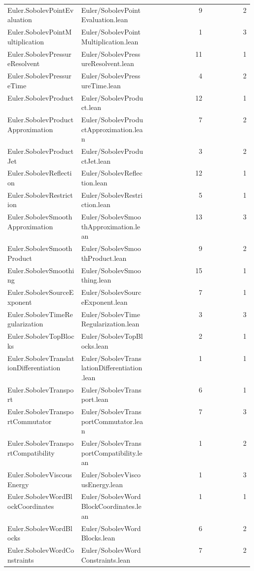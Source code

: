 \begin{longtable}{p{0.30\linewidth}p{0.28\linewidth}rr}
Euler.SobolevPointEvaluation & Euler/SobolevPointEvaluation.lean & 9 & 2\\
Euler.SobolevPointMultiplication & Euler/SobolevPointMultiplication.lean & 1 & 3\\
Euler.SobolevPressureResolvent & Euler/SobolevPressureResolvent.lean & 11 & 1\\
Euler.SobolevPressureTime & Euler/SobolevPressureTime.lean & 4 & 2\\
Euler.SobolevProduct & Euler/SobolevProduct.lean & 12 & 1\\
Euler.SobolevProductApproximation & Euler/SobolevProductApproximation.lean & 7 & 2\\
Euler.SobolevProductJet & Euler/SobolevProductJet.lean & 3 & 2\\
Euler.SobolevReflection & Euler/SobolevReflection.lean & 12 & 1\\
Euler.SobolevRestriction & Euler/SobolevRestriction.lean & 5 & 1\\
Euler.SobolevSmoothApproximation & Euler/SobolevSmoothApproximation.lean & 13 & 3\\
Euler.SobolevSmoothProduct & Euler/SobolevSmoothProduct.lean & 9 & 2\\
Euler.SobolevSmoothing & Euler/SobolevSmoothing.lean & 15 & 1\\
Euler.SobolevSourceExponent & Euler/SobolevSourceExponent.lean & 7 & 1\\
Euler.SobolevTimeRegularization & Euler/SobolevTimeRegularization.lean & 3 & 3\\
Euler.SobolevTopBlocks & Euler/SobolevTopBlocks.lean & 2 & 1\\
Euler.SobolevTranslationDifferentiation & Euler/SobolevTranslationDifferentiation.lean & 1 & 1\\
Euler.SobolevTransport & Euler/SobolevTransport.lean & 6 & 1\\
Euler.SobolevTransportCommutator & Euler/SobolevTransportCommutator.lean & 7 & 3\\
Euler.SobolevTransportCompatibility & Euler/SobolevTransportCompatibility.lean & 1 & 2\\
Euler.SobolevViscousEnergy & Euler/SobolevViscousEnergy.lean & 1 & 3\\
Euler.SobolevWordBlockCoordinates & Euler/SobolevWordBlockCoordinates.lean & 1 & 1\\
Euler.SobolevWordBlocks & Euler/SobolevWordBlocks.lean & 6 & 2\\
Euler.SobolevWordConstraints & Euler/SobolevWordConstraints.lean & 7 & 2\\

\end{longtable}

